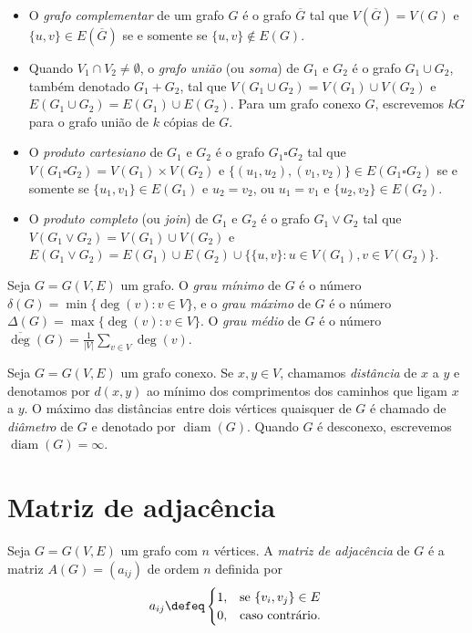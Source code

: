\documentclass{article}
\begin{document}
\begin{itemize}
    \item O \emph{grafo complementar} de um grafo \(G\) é o grafo \(\overline{G}\) tal que \(V(\overline{G}) = V(G)\) e \(\{u,v\} \in E(\overline{G})\) se e somente se \(\{u,v\} \notin E(G)\).
    \item Quando \(V_1 \cap V_2 \neq \emptyset\), o \emph{grafo união} (ou \emph{soma}) de \(G_1\) e \(G_2\) é o grafo \(G_1 \cup G_2\), também denotado \(G_1 + G_2\), tal que \(V(G_1 \cup G_2) = V(G_1) \cup V(G_2)\) e \(E(G_1 \cup G_2) = E(G_1) \cup E(G_2)\). Para um grafo conexo \(G\), escrevemos \(kG\) para o grafo união de \(k\) cópias de \(G\).
    \item O \emph{produto cartesiano} de \(G_1\) e \(G_2\) é o grafo \(G_1 \square G_2\) tal que \(V(G_1 \square G_2) = V(G_1) \times V(G_2)\) e \(\{(u_1, u_2), (v_1, v_2)\} \in E(G_1 \square G_2)\) se e somente se \(\{u_1, v_1\} \in E(G_1)\) e \(u_2 = v_2\), ou \(u_1 = v_1\) e \(\{u_2, v_2\} \in E(G_2)\).
    \item O \emph{produto completo} (ou \emph{join}) de \(G_1\) e \(G_2\) é o grafo \(G_1 \vee G_2\) tal que \(V(G_1 \vee G_2) = V(G_1) \cup V(G_2)\) e \(E(G_1 \vee G_2) = E(G_1) \cup E(G_2) \cup \{\{u,v\} : u \in V(G_1), v \in V(G_2)\}\).
\end{itemize}

\begin{defn}
    Seja \(G=G(V,E)\) um grafo. O \emph{grau mínimo} de \(G\) é o número \(\delta(G) = \min\{\deg(v) : v \in V\}\), e o \emph{grau máximo} de \(G\) é o número \(\Delta(G) = \max\{\deg(v) : v \in V\}\). O \emph{grau médio} de \(G\) é o número \(\overline{\deg}(G) = \frac{1}{|V|} \sum_{v \in V} \deg(v)\).
\end{defn}

\begin{defn}
    Seja \(G = G(V,E)\) um grafo conexo. Se \(x, y \in V\), chamamos \emph{distância} de \(x\) a \(y\) e denotamos por \(d(x,y)\) ao mínimo dos comprimentos dos caminhos que ligam \(x\) a \(y\). O máximo das distâncias entre dois vértices quaisquer de \(G\) é chamado de \emph{diâmetro} de \(G\) e denotado por \(\operatorname{diam}(G)\). Quando \(G\) é desconexo, escrevemos \(\operatorname{diam}(G) = \infty\).
\end{defn}

\section{Matriz de adjacência}

\begin{defn}
    Seja \(G = G(V,E)\) um grafo com \(n\) vértices. A \emph{matriz de adjacência} de \(G\) é a matriz \(A(G) = (a_{ij})\) de ordem \(n\) definida por
    \[
        a_{ij} \defeq \begin{cases}
            1, & \text{se } \{v_i, v_j\} \in E\, \\
            0, & \text{caso contrário}.
        \end{cases}
    \]
\end{defn}
\end{document}
